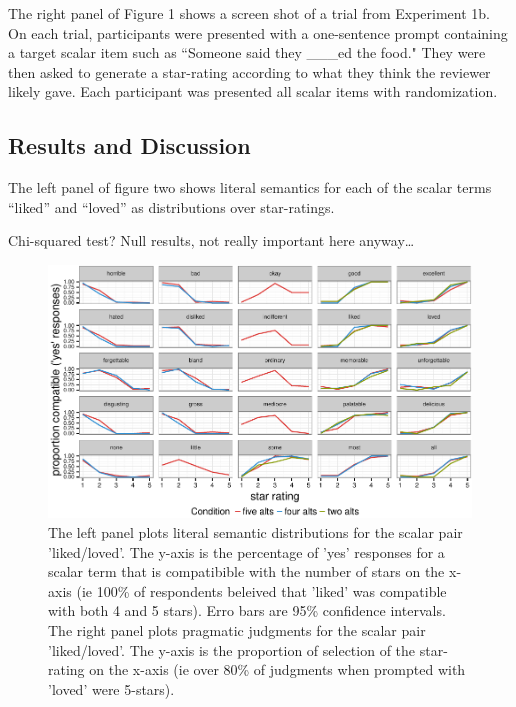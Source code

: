 \documentclass[10pt, letterpaper]{article}
\newenvironment{CodeChunk}{}{}
\begin{document}
The right panel of Figure 1 shows a screen shot of a trial from
Experiment 1b. On each trial, participants were presented with a
one-sentence prompt containing a target scalar item such as ``Someone
said they \_\_\_ed the food." They were then asked to generate a
star-rating according to what they think the reviewer likely gave. Each
participant was presented all scalar items with randomization.

\subsection{Results and Discussion}\label{results-and-discussion}

The left panel of figure two shows literal semantics for each of the
scalar terms ``liked'' and ``loved'' as distributions over star-ratings.

Chi-squared test? Null results, not really important here anyway\ldots{}

\begin{CodeChunk}
\begin{figure}[t]

{\centering \includegraphics{figs/exp1Plots-1} 

}

\caption[The left panel plots literal semantic distributions for the scalar pair 'liked/loved']{The left panel plots literal semantic distributions for the scalar pair 'liked/loved'. The y-axis is the percentage of 'yes' responses for a scalar term that is compatibible with the number of stars on the x-axis (ie 100\% of respondents beleived that 'liked' was compatible with both 4 and 5 stars). Erro bars are 95\% confidence intervals. The right panel plots pragmatic judgments for the scalar pair 'liked/loved'. The y-axis is the proportion of selection of the star-rating on the x-axis (ie over 80\% of judgments when prompted with 'loved' were 5-stars).}\label{fig:exp1Plots}
\end{figure}
\end{CodeChunk}
\end{document}
